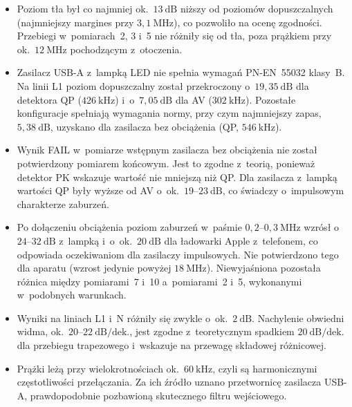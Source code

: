 \documentclass[11pt,a4paper]{article}
\begin{document}
\begin{itemize}
  \item Poziom tła był co najmniej ok.~$13\ \mathrm{dB}$ niższy od poziomów dopuszczalnych
        (najmniejszy margines przy $3{,}1\ \mathrm{MHz}$), co pozwoliło na ocenę zgodności.
        Przebiegi w~pomiarach~2, 3 i~5 nie różniły się od tła, poza prążkiem przy
        ok.~$12\ \mathrm{MHz}$ pochodzącym z~otoczenia.

  \item Zasilacz USB-A z~lampką LED nie spełnia wymagań PN-EN~55032 klasy~B. Na linii L1
        poziom dopuszczalny został przekroczony o~$19{,}35\ \mathrm{dB}$ dla detektora QP
        ($426\ \mathrm{kHz}$) i~o~$7{,}05\ \mathrm{dB}$ dla AV ($302\ \mathrm{kHz}$). Pozostałe
        konfiguracje spełniają wymagania normy, przy czym najmniejszy zapas,
        $5{,}38\ \mathrm{dB}$, uzyskano dla zasilacza bez obciążenia (QP, $546\ \mathrm{kHz}$).

  \item Wynik FAIL w~pomiarze wstępnym zasilacza bez obciążenia nie został potwierdzony
        pomiarem końcowym. Jest to zgodne z~teorią, ponieważ detektor PK wskazuje wartość nie
        mniejszą niż QP. Dla zasilacza z~lampką wartości QP były wyższe od AV o~ok.~$19$--$23\ \mathrm{dB}$, co
        świadczy o~impulsowym charakterze zaburzeń.

  \item Po dołączeniu obciążenia poziom zaburzeń w~paśmie $0{,}2$--$0{,}3\ \mathrm{MHz}$
        wzrósł o~$24$--$32\ \mathrm{dB}$ z~lampką i~o~ok.~$20\ \mathrm{dB}$ dla ładowarki
        Apple z~telefonem, co odpowiada oczekiwaniom dla zasilaczy impulsowych. Nie
        potwierdzono tego dla aparatu (wzrost jedynie powyżej $18\ \mathrm{MHz}$).
        Niewyjaśniona pozostała różnica między pomiarami~7 i~10 a~pomiarami~2 i~5,
        wykonanymi w~podobnych warunkach.

  \item Wyniki na liniach L1 i~N różniły się zwykle o~ok.~$2\ \mathrm{dB}$. Nachylenie obwiedni
        widma, ok.~$20$--$22\ \mathrm{dB/dek.}$, jest zgodne z~teoretycznym spadkiem
        $20\ \mathrm{dB/dek.}$ dla przebiegu trapezowego i~wskazuje na przewagę składowej
        różnicowej.

  \item Prążki leżą przy wielokrotnościach ok.~$60\ \mathrm{kHz}$, czyli są harmonicznymi częstotliwości
        przełączania. Za ich źródło uznano przetwornicę zasilacza USB-A, prawdopodobnie
        pozbawioną skutecznego filtru wejściowego.
\end{itemize}
\end{document}
